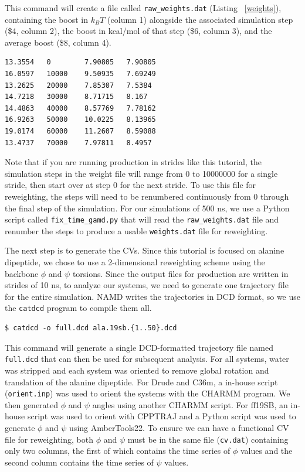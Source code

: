 \documentclass[9pt,tutorial,pubversion]{livecoms}
\begin{document}
This command will create a file called \texttt{raw\_weights.dat} (Listing ~\ref{weights}), containing the boost in $k_{B}T$ (column 1) alongside the associated simulation step (\$4, column 2), the boost in kcal/mol of that step (\$6, column 3), and the average boost (\$8, column 4). 


\begin{lstlisting}[label=weights, caption=raw\_weights.dat, basicstyle=\small, backgroundcolor=\color{light-gray}]
13.3554   0 	   7.90805 	 7.90805
16.0597   10000    9.50935 	 7.69249
13.2625	  20000    7.85307 	 7.5384
14.7218   30000    8.71715 	 8.167
14.4863   40000    8.57769 	 7.78162
16.9263   50000    10.0225 	 8.13965
19.0174   60000    11.2607 	 8.59088
13.4737   70000    7.97811 	 8.4957
\end{lstlisting}

Note that if you are running production in strides like this tutorial, the simulation steps in the weight file will range from 0 to 10000000 for a single stride, then start over at step 0 for the next stride. To use this file for reweighting, the steps will need to be renumbered continuously from 0 through the final step of the simulation. For our simulations of 500 ns, we use a Python script called \texttt{fix\_time\_gamd.py} that will read the \texttt{raw\_weights.dat} file and renumber the steps to produce a usable \texttt{weights.dat} file for reweighting. 

The next step is to generate the CVs. Since this tutorial is focused on alanine dipeptide, we chose to use a 2-dimensional reweighting scheme using the backbone $\phi$ and $\psi$ torsions. Since the output files for production are written in strides of 10 ns, to analyze our systems, we need to generate one trajectory file for the entire simulation. NAMD writes the trajectories in DCD format, so we use the \texttt{catdcd} program to compile them all.

\begin{lstlisting}[style=MyBash]
$ catdcd -o full.dcd ala.19sb.{1..50}.dcd
\end{lstlisting}

This command will generate a single DCD-formatted trajectory file named \texttt{full.dcd} that can then be used for subsequent analysis. For all systems, water was stripped and each system was oriented to remove global rotation and translation of the alanine dipeptide. For Drude and C36m, a in-house script (\texttt{orient.inp}) was used to orient the systems with the CHARMM program. We then generated $\phi$ and $\psi$ angles using another CHARMM script. For ff19SB, an in-house script was used to orient with CPPTRAJ and a Python script was used to generate $\phi$ and $\psi$ using AmberTools22. To ensure we can have a functional CV file for reweighting, both $\phi$ and $\psi$ must be in the same file (\texttt{cv.dat}) containing only two columns, the first of which contains the time series of $\phi$ values and the second column contains the time series of $\psi$ values.
\end{document}
